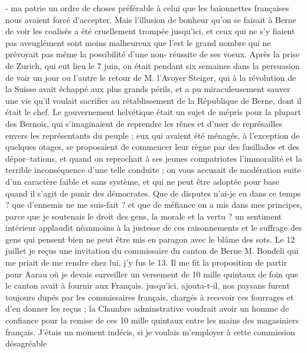 \documentclass[12pt]{article}
\begin{document}
 - ma patrie un ordre de choses préférable à celui
que les baïonnettes françaises nous avaient forcé d’accepter. Mais l’illusion de bonheur qu’on se
faisait à Berne de voir les coalisés a été cruellement trompée jusqu’ici, et ceux qui ne s’y fiaient
pas aveuglément sont moins malheureux que l’est le grand nombre qui ne prévoyait pas même la
possibilité d’une non- réussite de ses voeux. Après la prise de Zurich, qui eut lieu le 7 juin, on
était pendant six semaines dans la persuasion de voir un jour ou l’autre le retour de M. l’Avoyer
Steiger, qui à la révolution de la Suisse avait échappé aux plus grands périls, et a pu
miraculeusement sauver une vie qu’il voulait sacrifier au rétablissement de la République de Berne,
dont il était le chef. Le gouvernement helvétique était un sujet de mépris pour la plupart des
Bernois, qui s’imaginaient de reprendre les rênes et d’user de représailles envers les représentants
du peuple ; eux qui avaient été ménagés, à l’exception de quelques otages, se proposaient de
commencer leur règne par des fusillades et des dépor–tations, et quand on reprochait à ses jeunes
compatriotes l’immoralité et la terrible inconséquence d’une telle conduite ; on vous accusait de
modération suite d’un caractère faible et sans système, et qui ne peut être adoptée pour base quand
il s’agit de punir des démocrates. Que de disputes n’ai-je eu dans ce temps ? que d’ennemis ne me
suis-fait ? et que de méfiance on a mis dans mes principes, parce que je soutenais le droit des
gens, la morale et la vertu ? un sentiment intérieur applaudit néanmoins à la justesse de ces
raisonnements et le suffrage des gens qui pensent bien ne peut être mis en paragon avec le blâme des
sots. Le 12 juillet je reçus une invitation du commissaire du canton de Berne M. Bondeli qui me
priait de me rendre chez lui, j’y fus le 13. Il me fit la proposition de partir pour Aarau où je
devais surveiller un versement de 10 mille quintaux de foin que le canton avait à fournir aux
Français. jusqu’ici, ajouta-t-il, nos paysans furent toujours dupés par les commissaires français,
chargés à recevoir ces fourrages et d’en donner les reçus ; la Chambre adminstrative voudrait avoir
un homme de confiance pour la remise de ces 10 mille quintaux entre les mains des magasiniers
français. J’étais un moment indécis, si je voulais m’employer à cette commission désagréable
\end{document}
